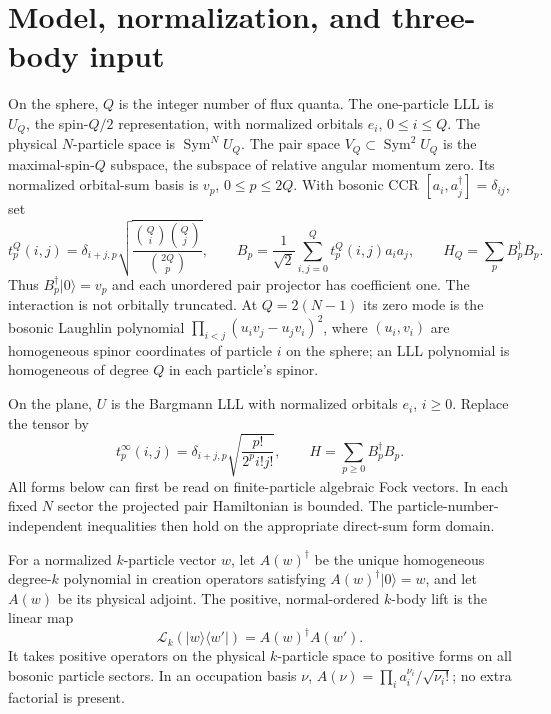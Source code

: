 \documentclass[11pt]{article}
\newcommand{\Sym}{\operatorname{Sym}}
\begin{document}
\section{Model, normalization, and three-body input}
On the sphere, $Q$ is the integer number of flux quanta. The one-particle LLL
is $U_Q$, the spin-$Q/2$ representation, with normalized orbitals $e_i$,
$0\le i\le Q$. The physical $N$-particle space is $\Sym^N U_Q$.
The pair space $V_Q\subset\Sym^2U_Q$ is the maximal-spin-$Q$ subspace,
the subspace of relative angular momentum zero. Its normalized orbital-sum basis
is $v_p$, $0\le p\le2Q$. With bosonic CCR
$[a_i,a_j^\dagger]=\delta_{ij}$, set
\begin{equation}
 t_p^Q(i,j)=\delta_{i+j,p}
 \sqrt{\frac{\binom Qi\binom Qj}{\binom{2Q}p}},\qquad
 B_p=\frac1{\sqrt2}\sum_{i,j=0}^Q t_p^Q(i,j)a_i a_j,
 \qquad H_Q=\sum_p B_p^\dagger B_p.
\end{equation}
Thus $B_p^\dagger|0\rangle=v_p$ and each unordered pair projector has
coefficient one. The interaction is not orbitally truncated. At
$Q=2(N-1)$ its zero mode is the bosonic Laughlin polynomial
$\prod_{i<j}(u_iv_j-u_jv_i)^2$, where $(u_i,v_i)$ are homogeneous
spinor coordinates of particle $i$ on the sphere; an LLL polynomial is
homogeneous of degree $Q$ in each particle's spinor.

On the plane, $U$ is the Bargmann LLL with normalized orbitals $e_i$,
$i\ge0$. Replace the tensor by
\begin{equation}
 t_p^\infty(i,j)=\delta_{i+j,p}
 \sqrt{\frac{p!}{2^p i!j!}},\qquad H=\sum_{p\ge0}B_p^\dagger B_p.
\end{equation}
All forms below can first be read on finite-particle algebraic Fock vectors.
In each fixed $N$ sector the projected pair Hamiltonian is bounded. The
particle-number-independent inequalities then hold on the appropriate
direct-sum form domain.

For a normalized $k$-particle vector $w$, let $A(w)^\dagger$ be the unique
homogeneous degree-$k$ polynomial in creation operators satisfying
$A(w)^\dagger|0\rangle=w$, and let $A(w)$ be its physical adjoint.
The positive, normal-ordered $k$-body lift is the linear map
\begin{equation}
 \mathcal L_k(|w\rangle\langle w'|)=A(w)^\dagger A(w').
\end{equation}
It takes positive operators on the physical $k$-particle space to positive
forms on all bosonic particle sectors. In an occupation basis $\nu$,
$A(\nu)=\prod_i a_i^{\nu_i}/\sqrt{\nu_i!}$; no extra factorial is present.
\end{document}

